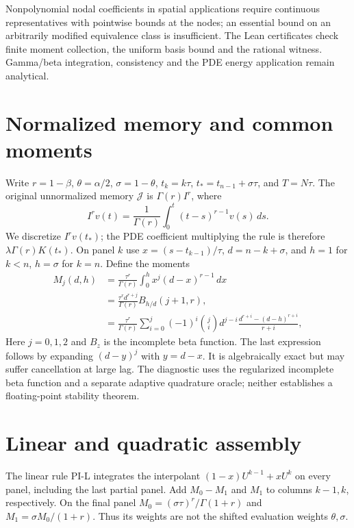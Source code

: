 \documentclass[11pt,a4paper]{article}
\begin{document}
Nonpolynomial nodal coefficients in spatial applications require continuous
representatives with pointwise bounds at the nodes; an essential bound on an
arbitrarily modified equivalence class is insufficient.
The Lean certificates check finite moment collection, the uniform basis
bound and the rational witness. Gamma/beta integration, consistency and the
PDE energy application remain analytical.

\section{Normalized memory and common moments}
Write $r=1-\beta$, $\theta=\alpha/2$, $\sigma=1-\theta$, $t_k=k\tau$, $t_*=t_{n-1}+\sigma\tau$, and $T=N\tau$. The original unnormalized memory $\mathcal J$ is $\Gamma(r)I^r$, where
\[
 I^r v(t)=\frac1{\Gamma(r)}\int_0^t(t-s)^{r-1}v(s)\,ds.
\]
We discretize $I^r v(t_*)$; the PDE coefficient multiplying the rule is therefore $\lambda\Gamma(r)K(t_*)$. On panel $k$ use $x=(s-t_{k-1})/\tau$, $d=n-k+\sigma$, and $h=1$ for $k<n$, $h=\sigma$ for $k=n$. Define the moments
\begin{align*}
 M_j(d,h)&=\frac{\tau^r}{\Gamma(r)}\int_0^h x^j(d-x)^{r-1}\,dx\\
 &=\frac{\tau^rd^{r+j}}{\Gamma(r)}B_{h/d}(j+1,r),\\
 &=\frac{\tau^r}{\Gamma(r)}\sum_{i=0}^j(-1)^i\binom ji d^{j-i}
       \frac{d^{r+i}-(d-h)^{r+i}}{r+i},
\end{align*}
Here $j=0,1,2$ and $B_z$ is the incomplete beta function. The last expression follows by expanding $(d-y)^j$ with $y=d-x$. It is algebraically exact but may suffer cancellation at large lag. The diagnostic uses the regularized incomplete beta function and a separate adaptive quadrature oracle; neither establishes a floating-point stability theorem.
\section{Linear and quadratic assembly}
The linear rule PI-L integrates the interpolant $(1-x)U^{k-1}+xU^k$ on every panel, including the last partial panel. Add $M_0-M_1$ and $M_1$ to columns $k-1,k$, respectively. On the final panel $M_0=(\sigma\tau)^r/\Gamma(1+r)$ and $M_1=\sigma M_0/(1+r)$. Thus its weights are not the shifted evaluation weights $\theta,\sigma$.
\end{document}
